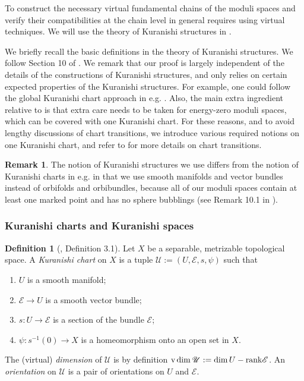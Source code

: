 \documentclass[10pt]{amsart}
\numberwithin{equation}{section}
\theoremstyle{plain}
\theoremstyle{definition}
\newtheorem{definition}[theorem]{Definition}
\newtheorem{remark}[theorem]{Remark}
\theoremstyle{remark}
\numberwithin{equation}{section}
\newcommand{\rank}{\textup{rank}}
\newcommand{\vdim}{\textup{v}\dim}
\begin{document}
{To construct the necessary virtual fundamental chains of the moduli spaces and verify their compatibilities at the chain level in general requires using virtual techniques. We will use the theory of Kuranishi structures in \cite{FOOO1,FOOO2,FOOO20book}. 

We briefly recall the basic definitions in the theory of Kuranishi structures.
We follow Section 10 of \cite{Irie2}. 
We remark that our proof is largely independent of the details of the constructions of Kuranishi structures, and only relies on certain expected properties of the Kuranishi structures. For example, one could follow the global Kuranishi chart approach in e.g. \cite{AMS1,Rabah,HirschiHugtenburg}.
Also, the main extra ingredient relative to \cite{Irie2} is that extra care needs to be taken for energy-zero moduli spaces, which can be covered with one Kuranishi chart.
For these reasons, and to avoid lengthy discussions of chart transitions, we introduce various required notions on one Kuranishi chart, and refer to \cite{FOOO20book} for more details on chart transitions.

\begin{remark}
	The notion of Kuranishi structures we use differs from the notion of Kuranishi charts in e.g. \cite{FOOO2} in that we use smooth manifolds and vector bundles instead of orbifolds and orbibundles, because all of our moduli spaces contain at least one marked point and has no sphere bubblings (see Remark 10.1 in \cite{Irie2}). 
\end{remark}



\subsubsection{Kuranishi charts and Kuranishi spaces}

\begin{definition}[\cite{FOOO20book}, Definition 3.1]\label{Defn: KuranishiChart}Let $X$ be a separable, metrizable topological space.
	A \emph{Kuranishi chart} on $X$ is a tuple $\mathscr{U}:= (U,\mathscr{E}, s,\psi)$ such that 
	\begin{enumerate}
		\item $U$ is a smooth manifold;
		\item $\mathscr{E}\to U$ is a smooth vector bundle;
		\item $s\colon U\to \mathscr{E}$ is a section of the bundle $\mathscr{E}$;
		\item $\psi\colon s^{-1}(0) \to X$ is a homeomorphism onto an open set in $X$.
	\end{enumerate}
	The (virtual) \emph{dimension} of $\mathscr{U}$ is by definition $\vdim\mathscr{U}:=\dim U -\rank   \mathscr{E}$.
	An \emph{orientation} on $\mathscr{U}$ is a pair of orientations on $U$ and $\mathscr{E}$.
\end{definition}

}
\end{document}
